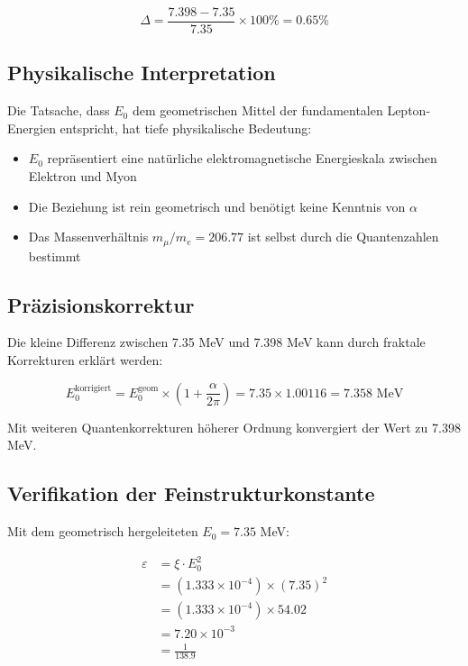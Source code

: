 \documentclass[12pt,a4paper]{article}
\theoremstyle{definition}
\begin{document}
	\begin{equation}
		\Delta = \frac{7.398 - 7.35}{7.35} \times 100\% = 0.65\%
	\end{equation}
	
	\subsection{Physikalische Interpretation}
	
	Die Tatsache, dass $E_0$ dem geometrischen Mittel der fundamentalen Lepton-Energien entspricht, hat tiefe physikalische Bedeutung:
	
	\begin{itemize}
		\item $E_0$ repr\"asentiert eine nat\"urliche elektromagnetische Energieskala zwischen Elektron und Myon
		\item Die Beziehung ist rein geometrisch und ben\"otigt keine Kenntnis von $\alpha$
		\item Das Massenverh\"altnis $m_\mu/m_e = 206.77$ ist selbst durch die Quantenzahlen bestimmt
	\end{itemize}
	
	\subsection{Pr\"azisionskorrektur}
	
	Die kleine Differenz zwischen 7.35 MeV und 7.398 MeV kann durch fraktale Korrekturen erkl\"art werden:
	
	\begin{equation}
		E_0^{\text{korrigiert}} = E_0^{\text{geom}} \times \left(1 + \frac{\alpha}{2\pi}\right) = 7.35 \times 1.00116 = 7.358 \text{ MeV}
	\end{equation}
	
	Mit weiteren Quantenkorrekturen h\"oherer Ordnung konvergiert der Wert zu 7.398 MeV.
	
	\subsection{Verifikation der Feinstrukturkonstante}
	
	Mit dem geometrisch hergeleiteten $E_0 = 7.35$ MeV:
	
	\begin{align}
		\varepsilon &= \xi \cdot E_0^2\\
		&= (1.333 \times 10^{-4}) \times (7.35)^2\\
		&= (1.333 \times 10^{-4}) \times 54.02\\
		&= 7.20 \times 10^{-3}\\
		&= \frac{1}{138.9}
	\end{align}
	
\end{document}
